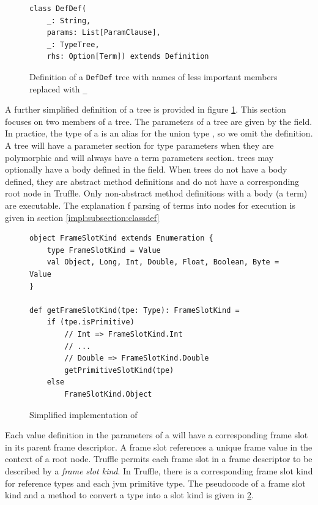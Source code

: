 \begin{figure}[!htb]
\begin{verbatim}
class DefDef(
	_: String, 
	params: List[ParamClause], 
	_: TypeTree, 
	rhs: Option[Term]) extends Definition	
\end{verbatim}
\caption{Definition of a \texttt{DefDef} tree with names of less important members replaced with \texttt{\_}}
\label{recall:defdef}
\end{figure}

A further simplified definition of a  tree is provided in figure \ref{recall:defdef}.
This section focuses on two members of a  tree.
The parameters of a  tree are given by the  field.
In practice, the type of a  is an alias for the union type , so we omit the  definition.
A  tree will have a parameter section for type parameters when they are polymorphic and will always have a term parameters section.
 trees may optionally have a body defined in the  field.
When trees do not have a body defined, they are abstract method definitions and do not have a corresponding root node in Truffle.
Only non-abstract method definitions with a body (a term) are executable.
The explanation f parsing of terms into nodes for execution is given in section \ref{impl:subsection:classdef}

\begin{figure}[!htb]
\begin{verbatim}
object FrameSlotKind extends Enumeration {
	type FrameSlotKind = Value
	val Object, Long, Int, Double, Float, Boolean, Byte = Value
}	
	
def getFrameSlotKind(tpe: Type): FrameSlotKind = 
	if (tpe.isPrimitive) 
		// Int => FrameSlotKind.Int
		// ...
		// Double => FrameSlotKind.Double
		getPrimitiveSlotKind(tpe)
	else  
		FrameSlotKind.Object
\end{verbatim}
\caption{Simplified implementation of }
\label{impl:frameslot-kind}
\end{figure}

Each value definition in the parameters of a  will have a corresponding frame slot in its parent frame descriptor. 
A frame slot references a unique frame value in the context of a root node.
Truffle permits each frame slot in a frame descriptor to be described by a \textit{frame slot kind}.
In Truffle, there is a corresponding frame slot kind for reference types and each \acrshort{jvm} primitive type. 
The pseudocode of a frame slot kind and a method to convert a type into a slot kind is given in \ref{impl:frameslot-kind}.

